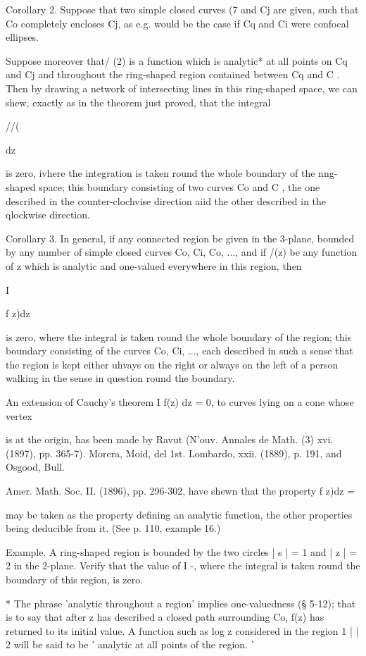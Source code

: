 {Corollary 2. Suppose that two simple closed curves (7 and Cj are
given, such that Co completely encloses Cj, as e.g. would be the case
if Cq and Ci were confocal ellipses.

Suppose moreover that/ (2) is a function which is analytic* at all
points on Cq and Cj and throughout the ring-shaped region contained
between Cq and C . Then by drawing a network of intersecting lines in
this ring-shaped space, we can shew, exactly as in the theorem just
proved, that the integral

//(

dz

is zero, ivhere the integration is taken round the whole boundary of
the nng-shaped space; this boundary consisting of two curves Co and C
, the one described in the counter-clochvise direction aiid the other
described in the qlockwise direction.

Corollary 3. In general, if any connected region be given in the
3-plane, bounded by any number of simple closed curves Co, Ci, Co,
..., and if /(z) be any function of z which is analytic and one-valued
everywhere in this region, then

I

f z)dz

is zero, where the integral is taken round the whole boundary of the
region; this boundary consisting of the curves Co, Ci, ..., each
described in such a sense that the region is kept either uhvays on the
right or always on the left of a person walking in the sense in
question round the boundary.

An extension of Cauchy's theorem I f(z) dz = 0, to curves lying on a
cone whose vertex

is at the origin, has been made by Ravut (N'ouv. Annales de Math. (3)
xvi. (1897), pp. 365-7). Morera, Moid, del 1st. Lombardo, xxii.
(1889), p. 191, and Osgood, Bull.

Amer. Math. Soc. II. (1896), pp. 296-302, have shewn that the property
f z)dz =

may be taken as the property defining an analytic function, the other
properties being deducible from it. (See p. 110, example 16.)

Example. A ring-shaped region is bounded by the two circles | s | = 1
and | z | = 2 in the 2-plane. Verify that the value of I -, where the
integral is taken round the boundary of this region, is zero.

* The phrase 'analytic throughout a region' implies one-valuedness (§
5-12); that is to say that after z has described a closed path
surrounding Co, f(z) has returned to its initial value. A function
such as log z considered in the region 1 | | 2 will be said to be '
analytic at all points of the region. '



}
